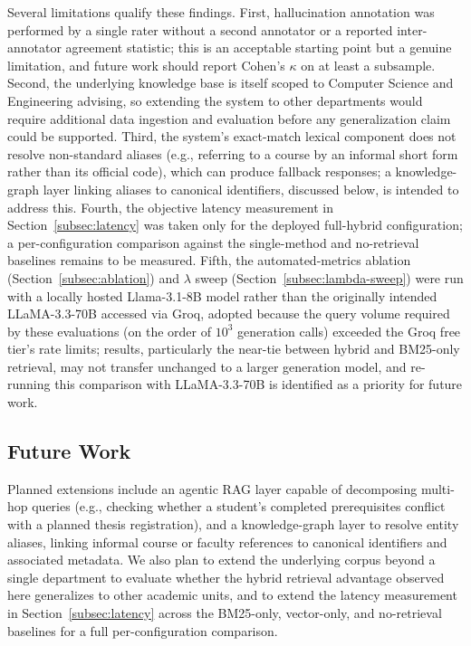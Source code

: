 \documentclass[a4paper,twoside]{article}
\begin{document}
Several limitations qualify these findings. First, hallucination annotation was performed by a single rater without a second annotator or a reported inter-annotator agreement statistic; this is an acceptable starting point but a genuine limitation, and future work should report Cohen's $\kappa$ on at least a subsample. Second, the underlying knowledge base is itself scoped to Computer Science and Engineering advising, so extending the system to other departments would require additional data ingestion and evaluation before any generalization claim could be supported. Third, the system's exact-match lexical component does not resolve non-standard aliases (e.g., referring to a course by an informal short form rather than its official code), which can produce fallback responses; a knowledge-graph layer linking aliases to canonical identifiers, discussed below, is intended to address this. Fourth, the objective latency measurement in Section~\ref{subsec:latency} was taken only for the deployed full-hybrid configuration; a per-configuration comparison against the single-method and no-retrieval baselines remains to be measured. Fifth, the automated-metrics ablation (Section~\ref{subsec:ablation}) and $\lambda$ sweep (Section~\ref{subsec:lambda-sweep}) were run with a locally hosted Llama-3.1-8B model rather than the originally intended LLaMA-3.3-70B accessed via Groq, adopted because the query volume required by these evaluations (on the order of $10^3$ generation calls) exceeded the Groq free tier's rate limits; results, particularly the near-tie between hybrid and BM25-only retrieval, may not transfer unchanged to a larger generation model, and re-running this comparison with LLaMA-3.3-70B is identified as a priority for future work.

\subsection{Future Work}

Planned extensions include an agentic RAG layer capable of decomposing multi-hop queries (e.g., checking whether a student's completed prerequisites conflict with a planned thesis registration), and a knowledge-graph layer to resolve entity aliases, linking informal course or faculty references to canonical identifiers and associated metadata. We also plan to extend the underlying corpus beyond a single department to evaluate whether the hybrid retrieval advantage observed here generalizes to other academic units, and to extend the latency measurement in Section~\ref{subsec:latency} across the BM25-only, vector-only, and no-retrieval baselines for a full per-configuration comparison.
\end{document}
